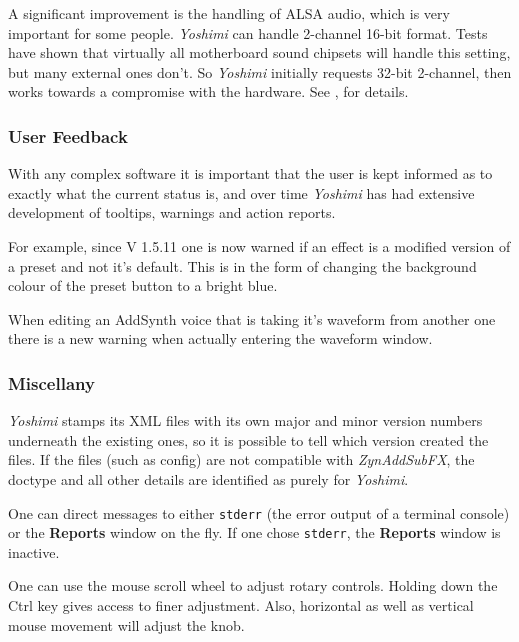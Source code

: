 \documentclass[
 11pt,
 twoside,
 a4paper,
 final                                 %
]{article}
\begin{document}
   A significant improvement is the handling of ALSA audio, which is very
   important for some people.  \textsl{Yoshimi} can handle 2-channel 16-bit
   format. Tests have shown that virtually all motherboard sound chipsets will
   handle this setting, but many external ones don't.  So \textsl{Yoshimi}
   initially requests 32-bit 2-channel, then works towards a compromise with the
   hardware.
   See , for details.

\subsubsection{User Feedback}
\label{subsubsec:new_features_user_feedback}
   With any complex software it is important that the user is kept informed
   as to exactly what the current status is, and over time \textsl{Yoshimi}
   has had extensive development of tooltips, warnings and action reports.

   For example, since V 1.5.11 one is now warned if an effect is a modified
   version of a preset and not it's default. This is in the form of changing
   the background colour of the preset button to a bright blue.

   When editing an AddSynth voice that is taking it's waveform from another one
   there is a new warning when actually entering the waveform window.

\subsubsection{Miscellany}
\label{subsubsec:new_features_miscellany}

   \textsl{Yoshimi} stamps its XML files
   with its own major
   and minor version numbers underneath the existing ones, so it is possible
   to tell which version created the files.
   If the files (such as config) are not compatible with
   \textsl{ZynAddSubFX},
   the doctype and all other details are identified as purely for
   \textsl{Yoshimi}.

   One can direct messages to either \texttt{stderr}
   (the error output of a terminal console) or the \textbf{Reports} window
   on the fly. If one chose \texttt{stderr}, the \textbf{Reports} window is
   inactive.

   One can use the mouse scroll wheel to adjust rotary controls. Holding
   down the Ctrl key gives access to finer adjustment.  Also, horizontal as
   well as vertical mouse movement will adjust the knob.
\end{document}
